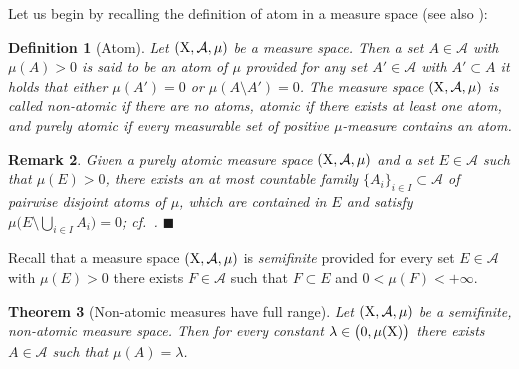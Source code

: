 \documentclass[reqno]{amsart}
\numberwithin{equation}{section}
\newcommand{\X}{{\rm X}}
\newcommand{\1}{\mathbbm 1}
\newcommand{\fr}{\penalty-20\null\hfill\(\blacksquare\)}
\newtheorem{theorem}{Theorem}[section]
\newtheorem{definition}[theorem]{Definition}
\newtheorem{remark}[theorem]{Remark}
\begin{document}
Let us begin by recalling the definition of atom in a measure space
(see also \cite{Bogachev07}):
%
%
\begin{definition}[Atom]
Let \((\X,\mathcal A,\mu)\) be a measure space. Then a set \(A\in\mathcal A\) with \(\mu(A)>0\)
is said to be an \emph{atom} of \(\mu\) provided for any set \(A'\in\mathcal A\) with
\(A'\subset A\) it holds that either \(\mu(A')=0\) or \(\mu(A\setminus A')=0\).
The measure space \((\X,\mathcal A,\mu)\) is called \emph{non-atomic} if there are no atoms,
\emph{atomic} if there exists at least one atom, and \emph{purely atomic} if every measurable
set of positive \(\mu\)-measure contains an atom.
\end{definition}
%
%
\begin{remark}\label{rmk:cover_by_atoms}{\rm
Given a purely atomic measure space \((\X,\mathcal A,\mu)\) and a set
\(E\in\mathcal A\) such that \(\mu(E)>0\), there exists an at most countable
family \(\{A_i\}_{i\in I}\subset\mathcal A\) of pairwise disjoint atoms of \(\mu\),
which are contained in \(E\) and satisfy \(\mu\big(E\setminus\bigcup_{i\in I}A_i\big)=0\);
cf.\ \cite[Theorem 2.2]{Johnson70}.
\fr}\end{remark}
%
%
Recall that a measure space \((\X,\mathcal A,\mu)\) is \emph{semifinite}
provided for every set \(E\in\mathcal A\) with \(\mu(E)>0\) there exists
\(F\in\mathcal A\) such that \(F\subset E\) and \(0<\mu(F)<+\infty\).
%
%
\begin{theorem}[Non-atomic measures have full range]\label{thm:Lyapunov}
Let \((\X,\mathcal A,\mu)\) be a semifinite, non-atomic measure space.
Then for every constant \(\lambda\in\big(0,\mu(\X)\big)\) there exists \(A\in\mathcal A\)
such that \(\mu(A)=\lambda\).
\end{theorem}
\end{document}
